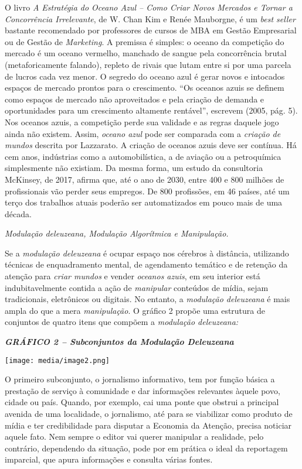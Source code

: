 O livro \emph{A Estratégia do Oceano Azul -- Como Criar Novos Mercados e
Tornar a Concorrência Irrelevante}, de W. Chan Kim e Renée Mauborgne, é
um \emph{best seller} bastante recomendado por professores de cursos de
MBA em Gestão Empresarial ou de Gestão de \emph{Marketing}. A premissa é
simples: o oceano da competição do mercado é um oceano vermelho,
manchado de sangue pela concorrência brutal (metaforicamente falando),
repleto de rivais que lutam entre si por uma parcela de lucros cada vez
menor. O segredo do oceano azul é gerar novos e intocados espaços de
mercado prontos para o crescimento. ``Os oceanos azuis se definem como
espaços de mercado não aproveitados e pela criação de demanda e
oportunidades para um crescimento altamente rentável'', escrevem (2005,
pág. 5). Nos oceanos azuis, a competição perde sua validade e as regras
daquele jogo ainda não existem. Assim, \emph{oceano azul} pode ser
comparada com a \emph{criação de mundos} descrita por Lazzarato. A
criação de oceanos azuis deve ser contínua. Há cem anos, indústrias como
a automobilística, a de aviação ou a petroquímica simplesmente não
existiam. Da mesma forma, um estudo da consultoria McKinsey, de 2017,
afirma que, até o ano de 2030, entre 400 e 800 milhões de profissionais
vão perder seus empregos. De 800 profissões, em 46 países, até um terço
dos trabalhos atuais poderão ser automatizados em pouco mais de uma
década.

\emph{Modulação deleuzeana, Modulação Algorítmica e Manipulação.}

Se a \emph{modulação deleuzeana} é ocupar espaço nos cérebros à
distância, utilizando técnicas de enquadramento mental, de agendamento
temático e de retenção da atenção para \emph{criar mundos} e vender
\emph{oceanos azuis}, em seu interior está indubitavelmente contida a
ação de \emph{manipular} conteúdos de mídia, sejam tradicionais,
eletrônicos ou digitais. No entanto, a \emph{modulação deleuzeana} é
mais ampla do que a mera \emph{manipulação}. O gráfico 2 propõe uma
estrutura de conjuntos de quatro itens que compõem a \emph{modulação
deleuzeana:}

\emph{\textbf{GRÁFICO 2 -- Subconjuntos da Modulação Deleuzeana}}

\texttt{[image: media/image2.png]}

O primeiro subconjunto, o jornalismo informativo, tem por função básica
a prestação de serviço à comunidade e dar informações relevantes àquele
povo, cidade ou país. Quando, por exemplo, cai uma ponte que obstrui a
principal avenida de uma localidade, o jornalismo, até para se
viabilizar como produto de mídia e ter credibilidade para disputar a
Economia da Atenção, precisa noticiar aquele fato. Nem sempre o editor
vai querer manipular a realidade, pelo contrário, dependendo da
situação, pode por em prática o ideal da reportagem imparcial, que apura
informações e consulta várias fontes.

